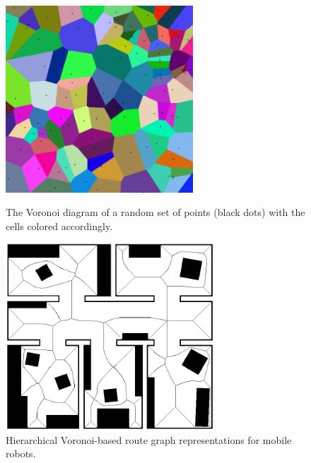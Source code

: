 \documentclass[]{usiinfbachelorproject}
\begin{document}
\begin{figure}[ht]
	\begin{minipage}[c]{0.5\linewidth}
		\centering
		\includegraphics[height=7cm]{img/voronoi_color.png}
		\caption{The Voronoi diagram of a random set of points (black dots) with the cells colored accordingly.}
		\label{fig:colorvoronoi}
	\end{minipage}
	\begin{minipage}[c]{0.5\linewidth}
		\centering
		\includegraphics[height=7cm]{img/voronoi_path.jpeg}
		\caption{Hierarchical Voronoi-based route graph representations for mobile robots.}
		\label{fig:robotpath}
	\end{minipage}
\end{figure}
\end{document}
